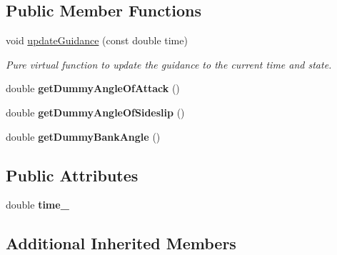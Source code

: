 \subsection*{Public Member Functions}
\begin{DoxyCompactItemize}
\item 
void \hyperlink{classtudat_1_1unit__tests_1_1DummyAngleCalculator_ac7c9dc1b0ab06c0807c368b44665bf2e}{update\+Guidance} (const double time)
\begin{DoxyCompactList}\small\item\em Pure virtual function to update the guidance to the current time and state. \end{DoxyCompactList}\item 
double {\bfseries get\+Dummy\+Angle\+Of\+Attack} ()\hypertarget{classtudat_1_1unit__tests_1_1DummyAngleCalculator_ab3a076b52ffb66deb06d7f3e10087f4e}{}\label{classtudat_1_1unit__tests_1_1DummyAngleCalculator_ab3a076b52ffb66deb06d7f3e10087f4e}

\item 
double {\bfseries get\+Dummy\+Angle\+Of\+Sideslip} ()\hypertarget{classtudat_1_1unit__tests_1_1DummyAngleCalculator_a121b589e1b90e641cba81e03ef9c6449}{}\label{classtudat_1_1unit__tests_1_1DummyAngleCalculator_a121b589e1b90e641cba81e03ef9c6449}

\item 
double {\bfseries get\+Dummy\+Bank\+Angle} ()\hypertarget{classtudat_1_1unit__tests_1_1DummyAngleCalculator_a2537651475e9a6a2c558cbd0f63517fc}{}\label{classtudat_1_1unit__tests_1_1DummyAngleCalculator_a2537651475e9a6a2c558cbd0f63517fc}

\end{DoxyCompactItemize}
\subsection*{Public Attributes}
\begin{DoxyCompactItemize}
\item 
double {\bfseries time\+\_\+}\hypertarget{classtudat_1_1unit__tests_1_1DummyAngleCalculator_af30833663e2472047b882b87407fdc1f}{}\label{classtudat_1_1unit__tests_1_1DummyAngleCalculator_af30833663e2472047b882b87407fdc1f}

\end{DoxyCompactItemize}
\subsection*{Additional Inherited Members}


